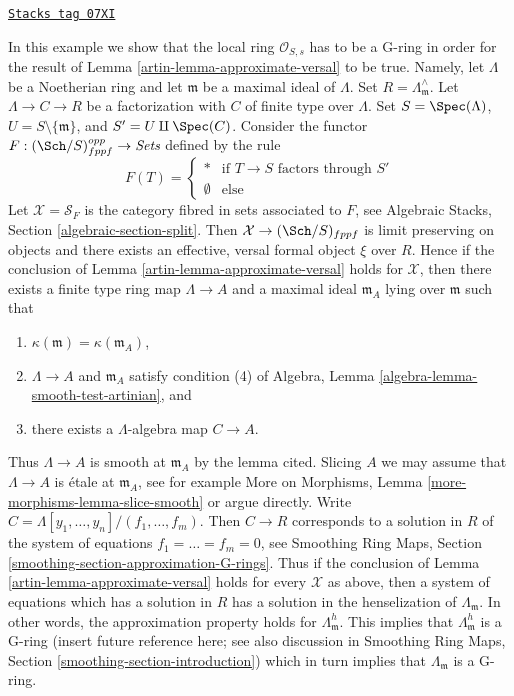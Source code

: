 \begin{example}
\label{artin-example-approximate-versal-implies}
\href{https://stacks.math.columbia.edu/tag/07XI}{\texttt{Stacks tag 07XI}}

In this example we show that the local ring $\mathcal{O}_{S, s}$ has to be
a G-ring in order for the result of Lemma \ref{artin-lemma-approximate-versal} to
be true. Namely, let $\Lambda$ be a Noetherian ring and let $\mathfrak m$
be a maximal ideal of $\Lambda$. Set $R = \Lambda_\mathfrak m^\wedge$. Let
$\Lambda \to C \to R$ be a factorization with $C$ of finite type over
$\Lambda$. Set $S = \Spec(\Lambda)$, $U = S \setminus \{\mathfrak m\}$, and
$S' = U \amalg \Spec(C)$. Consider the functor
$F : (\Sch/S)_{fppf}^{opp} \to \textit{Sets}$ defined by the rule
$$
F(T) =
\left\{
\begin{matrix}
* & \text{if }T \to S\text{ factors through }S' \\
\emptyset & \text{else}
\end{matrix}
\right.
$$
Let $\mathcal{X} = \mathcal{S}_F$ is the category fibred in sets associated
to $F$, see Algebraic Stacks, Section \ref{algebraic-section-split}.
Then $\mathcal{X} \to (\Sch/S)_{fppf}$ is limit preserving on objects and
there exists an effective, versal formal object $\xi$ over $R$.
Hence if the conclusion of Lemma \ref{artin-lemma-approximate-versal} holds
for $\mathcal{X}$, then there exists a finite type ring map $\Lambda \to A$
and a maximal ideal $\mathfrak m_A$ lying over $\mathfrak m$ such that
\begin{enumerate}
\item $\kappa(\mathfrak m) = \kappa(\mathfrak m_A)$,
\item $\Lambda \to A$ and $\mathfrak m_A$ satisfy condition (4) of
Algebra, Lemma \ref{algebra-lemma-smooth-test-artinian}, and
\item there exists a $\Lambda$-algebra map $C \to A$.
\end{enumerate}
Thus $\Lambda \to A$ is smooth at $\mathfrak m_A$ by the lemma cited.
Slicing $A$ we may assume that $\Lambda \to A$ is \'etale at
$\mathfrak m_A$, see for example
More on Morphisms, Lemma \ref{more-morphisms-lemma-slice-smooth}
or argue directly. Write $C = \Lambda[y_1, \ldots, y_n]/(f_1, \ldots, f_m)$.
Then $C \to R$ corresponds to a solution in $R$ of the system of equations
$f_1 = \ldots = f_m = 0$, see Smoothing Ring Maps, Section
\ref{smoothing-section-approximation-G-rings}.
Thus if the conclusion of
Lemma \ref{artin-lemma-approximate-versal} holds for every $\mathcal{X}$ as
above, then a system of equations which has a solution in $R$ has a
solution in the henselization of $\Lambda_{\mathfrak m}$.
In other words, the approximation property holds for
$\Lambda_{\mathfrak m}^h$. This implies that $\Lambda_{\mathfrak m}^h$
is a G-ring (insert future reference here; see also discussion in
Smoothing Ring Maps, Section \ref{smoothing-section-introduction})
which in turn implies that $\Lambda_{\mathfrak m}$ is a G-ring.
\end{example}

